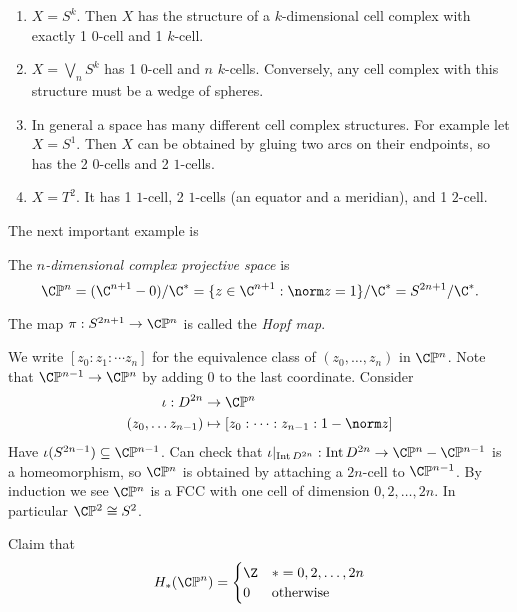 \documentclass[a4paper]{article}
\DeclareMathOperator{\Int}{Int} %
\renewcommand*{\P}{\mathbb{P}}
\begin{document}
\begin{eg}\leavevmode
  \begin{enumerate}
  \item \(X = S^k\). Then \(X\) has the structure of a \(k\)-dimensional cell complex with exactly 1 \(0\)-cell and 1 \(k\)-cell.
  \item \(X = \bigvee_n S^k\) has 1 \(0\)-cell and \(n\) \(k\)-cells. Conversely, any cell complex with this structure must be a wedge of spheres.
  \item In general a space has many different cell complex structures. For example let \(X = S^1\). Then \(X\) can be obtained by gluing two arcs on their endpoints, so has the 2 \(0\)-cells and 2 \(1\)-cells.
  \item \(X = T^2\). It has 1 \(1\)-cell, 2 \(1\)-cells (an equator and a meridian), and 1 \(2\)-cell.
  \end{enumerate}
\end{eg}

The next important example is

\begin{definition}
  The \emph{\(n\)-dimensional complex projective space} is
  \[
    \C\P^n
    = (\C^{n + 1} - 0)/\C^*
    = \{z \in \C^{n + 1}: \norm z = 1\}/\C^*
    = S^{2n + 1}/\C^*.
  \]

  The map \(\pi: S^{2n + 1} \to \C\P^n\) is called the \emph{Hopf map}.
\end{definition}

We write \([z_0: z_1: \cdots z_n]\) for the equivalence class of \((z_0, \dots, z_n)\) in \(\C\P^n\). Note that \(\C\P^{n - 1} \to \C\P^n\) by adding \(0\) to the last coordinate. Consider
\begin{align*}
  \iota: D^{2n} &\to \C\P^n \\
  (z_0, \dots z_{n - 1}) &\mapsto [z_0: \cdots : z_{n - 1}: 1 - \norm z]
\end{align*}
Have \(\iota(S^{2n - 1}) \subseteq \C\P^{n - 1}\). Can check that \(\iota|_{\Int D^{2n}}: \Int D^{2n} \to \C\P^n - \C\P^{n - 1}\) is a homeomorphism, so \(\C\P^n\) is obtained by attaching a \(2n\)-cell to \(\C\P^{n - 1}\). By induction we see \(\C\P^n\) is a FCC with one cell of dimension \(0, 2, \dots, 2n\). In particular \(\C\P^2 \cong S^2\).

Claim that
\[
  H_*(\C\P^n) =
  \begin{cases}
    \Z & * = 0, 2, \dots, 2n \\
    0 & \text{otherwise}
  \end{cases}
\]
\end{document}
